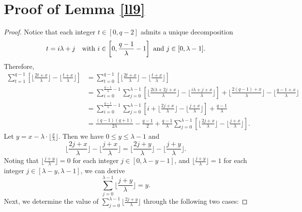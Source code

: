 \documentclass[journal,onecolumn]{IEEEtran}
\begin{document}
\section{Proof of Lemma \ref{ll9}}
\begin{proof}
Notice that each integer $t\in [0,q-2]$ admits a  unique decomposition 
    \begin{equation*}t=i\lambda+j  \quad \hbox{with }  i\in \left[0,\frac{q-1}{\lambda}-1\right] 
\hbox{ and }j\in [0,\lambda-1].\end{equation*} Therefore, 
\begin{equation}\label{le8e1}
\begin{split}
    \sum\limits_{t=1}^{q-1}\left[\lfloor  \frac{2t+x}{\lambda}\rfloor- \lfloor \frac{t+x}{\lambda}\rfloor\right]&=\sum\limits_{t=0}^{q-1}\left[\lfloor  \frac{2t+x}{\lambda}\rfloor- \lfloor \frac{t+x}{\lambda}\rfloor\right]\\  &=\sum\limits_{i=0}^{\frac{q-1}{\lambda}-1}\sum\limits_{j=0}^{\lambda-1}\left[ \lfloor \frac{2i\lambda+2j+x}{\lambda}\rfloor-\lfloor \frac{i\lambda+j+x}{\lambda}\rfloor    \right]+\lfloor \frac{2(q-1)+x}{\lambda}\rfloor-\lfloor \frac{q-1+x}{\lambda}\rfloor\\
    &=\sum\limits_{i=0}^{\frac{q-1}{\lambda}-1}\sum\limits_{j=0}^{\lambda-1}\left[ i+ \lfloor \frac{2j+x}{\lambda} \rfloor-\lfloor \frac{j+x}{\lambda}\rfloor \right]+\frac{q-1}{\lambda}\\
    &=\frac{(q-1)(q+1)}{2\lambda}-\frac{q-1}{2}+\frac{q-1}{\lambda}\sum\limits_{j=0}^{\lambda-1}\left[ \lfloor \frac{2j+x}{\lambda} \rfloor-\lfloor \frac{j+x}{\lambda}\rfloor \right].
    \end{split}
\end{equation}
Let $y=x-\lambda\cdot\lfloor \frac{x}{\lambda} \rfloor$. Then we have $0\leq y\leq \lambda-1$ and 
\begin{equation}\label{le8e2}
   \lfloor \frac{2j+x}{\lambda} \rfloor-\lfloor \frac{j+x}{\lambda}\rfloor = \lfloor \frac{2j+y}{\lambda} \rfloor-\lfloor \frac{j+y}{\lambda}\rfloor. 
\end{equation}
Noting that $\lfloor  \frac{j+y}{\lambda} \rfloor =0$ for each integer $j\in [0,\lambda-y-1]$, and $\lfloor  \frac{j+y}{\lambda} \rfloor =1$ for each integer $j\in [\lambda-y, \lambda-1]$, we can derive 
\begin{equation}\label{le8e3}
\sum\limits_{j=0}^{\lambda-1}\lfloor \frac{j+y}{\lambda}\rfloor = y.\end{equation} 
Next, we determine the value of $\sum\limits_{j=0}^{\lambda-1}\lfloor  \frac{2j+y}{\lambda} \rfloor$ through the following two cases:


\end{proof}
\end{document}
